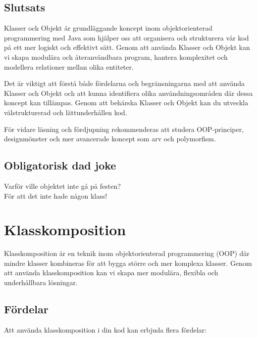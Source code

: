 \hypertarget{slutsats}{%
\subsection{Slutsats}\label{slutsats}}

Klasser och Objekt är grundläggande koncept inom objektorienterad
programmering med Java som hjälper oss att organisera och strukturera
vår kod på ett mer logiskt och effektivt sätt. Genom att använda Klasser
och Objekt kan vi skapa modulära och återanvändbara program, hantera
komplexitet och modellera relationer mellan olika entiteter.

Det är viktigt att förstå både fördelarna och begränsningarna med att
använda Klasser och Objekt och att kunna identifiera olika
användningsområden där dessa koncept kan tillämpas. Genom att behärska
Klasser och Objekt kan du utveckla välstrukturerad och lättunderhållen
kod.

För vidare läsning och fördjupning rekommenderas att studera
OOP-principer, designmönster och mer avancerade koncept som arv och
polymorfism.

\hypertarget{obligatorisk-dad-joke}{%
\subsection{Obligatorisk dad joke}\label{obligatorisk-dad-joke}}

Varför ville objektet inte gå på festen?\\
För att det inte hade någon klass!

\hypertarget{klasskomposition}{%
\section{Klasskomposition}\label{klasskomposition}}

Klasskomposition är en teknik inom objektorienterad programmering (OOP)
där mindre klasser kombineras för att bygga större och mer komplexa
klasser. Genom att använda klasskomposition kan vi skapa mer modulära,
flexibla och underhållbara lösningar.

\hypertarget{fuxf6rdelar}{%
\subsection{Fördelar}\label{fuxf6rdelar}}

Att använda klasskomposition i din kod kan erbjuda flera fördelar:

